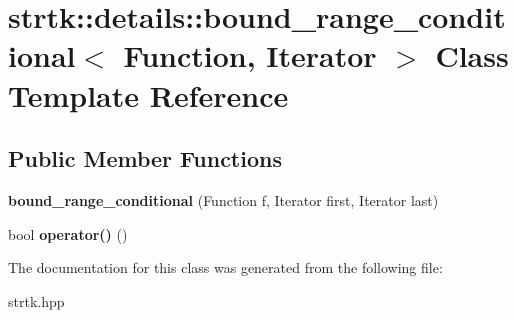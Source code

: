 \hypertarget{classstrtk_1_1details_1_1bound__range__conditional}{\section{strtk\-:\-:details\-:\-:bound\-\_\-range\-\_\-conditional$<$ Function, Iterator $>$ Class Template Reference}
\label{classstrtk_1_1details_1_1bound__range__conditional}
}
\subsection*{Public Member Functions}
\begin{DoxyCompactItemize}
\item 
\hypertarget{classstrtk_1_1details_1_1bound__range__conditional_a99b183dde7cc0aa7ee93f9101af12c54}{{\bfseries bound\-\_\-range\-\_\-conditional} (Function f, Iterator first, Iterator last)}\label{classstrtk_1_1details_1_1bound__range__conditional_a99b183dde7cc0aa7ee93f9101af12c54}

\item 
\hypertarget{classstrtk_1_1details_1_1bound__range__conditional_ac1c6004e2a24ae800728cb5ed7f4b753}{bool {\bfseries operator()} ()}\label{classstrtk_1_1details_1_1bound__range__conditional_ac1c6004e2a24ae800728cb5ed7f4b753}

\end{DoxyCompactItemize}


The documentation for this class was generated from the following file\-:\begin{DoxyCompactItemize}
\item 
strtk.\-hpp\end{DoxyCompactItemize}

